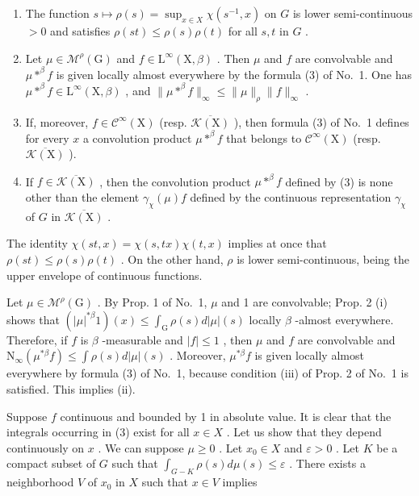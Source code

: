 \begin{enumerate}
\def\labelenumi{(\roman{enumi})}
\item
  The function \(s \mapsto \rho(s) = \sup_{x \in X} \chi(s^{-1}, x)\) on \(G\) is lower semi-continuous \(> 0\) and satisfies \(\rho(st) \leqslant \rho(s)\rho(t)\) for all \(s, t\) in \(G\) .
\item
  Let \(\mu \in \mathcal{M}^{\rho}(\mathrm{G})\) and \(f \in \mathrm{L}^{\infty}(\mathrm{X},\beta)\) . Then \(\mu\) and \(f\) are convolvable and \(\mu *^{\beta} f\) is given locally almost everywhere by the formula (3) of No.~1. One has \(\mu *^{\beta} f \in \mathrm{L}^{\infty}(\mathrm{X},\beta)\) , and \(\| \mu *^{\beta} f \|_{\infty} \leqslant \| \mu \|_{\rho} \| f \|_{\infty}\) .
\item
  If, moreover, \(f \in \mathcal{C}^{\infty}(\mathrm{X})\) (resp. \(\overline{\mathcal{K}(\mathrm{X})}\) ), then formula (3) of No.~1 defines for every \(x\) a convolution product \(\mu *^{\beta}f\) that belongs to \(\mathcal{C}^{\infty}(\mathrm{X})\) (resp. \(\overline{\mathcal{K}(\mathrm{X})}\) ).
\item
  If \(f \in \overline{\mathcal{K}(\mathrm{X})}\) , then the convolution product \(\mu *^{\beta}f\) defined by (3) is none other than the element \(\gamma_{\chi}(\mu)f\) defined by the continuous representation \(\gamma_{\chi}\) of \(G\) in \(\overline{\mathcal{K}(\mathrm{X})}\) .
\end{enumerate}

The identity \(\chi(st,x) = \chi(s,tx)\chi(t,x)\) implies at once that \(\rho(st) \leqslant \rho(s)\rho(t)\) . On the other hand, \(\rho\) is lower semi-continuous, being the upper envelope of continuous functions.

Let \(\mu \in \mathcal{M}^{\rho}(\mathrm{G})\) . By Prop. 1 of No.~1, \(\mu\) and 1 are convolvable; Prop. 2 (i) shows that \((|\mu|^{*\beta}1)(x) \leqslant \int_{\mathrm{G}} \rho(s)d|\mu|(s)\) locally \(\beta\) -almost everywhere. Therefore, if \(f\) is \(\beta\) -measurable and \(|f| \leqslant 1\) , then \(\mu\) and \(f\) are convolvable and \(\mathrm{N}_{\infty}(\mu^{*\beta}f) \leqslant \int \rho(s)d|\mu|(s)\) . Moreover, \(\mu^{*\beta}f\) is given locally almost everywhere by formula (3) of No.~1, because condition (iii) of Prop. 2 of No.~1 is satisfied. This implies (ii).

Suppose \(f\) continuous and bounded by 1 in absolute value. It is clear that the integrals occurring in (3) exist for all \(x \in X\) . Let us show that they depend continuously on \(x\) . We can suppose \(\mu \geqslant 0\) . Let \(x_0 \in X\) and \(\varepsilon > 0\) . Let \(K\) be a compact subset of \(G\) such that \(\int_{G - K} \rho(s) d\mu(s) \leqslant \varepsilon\) . There exists a neighborhood \(V\) of \(x_0\) in \(X\) such that \(x \in V\) implies

